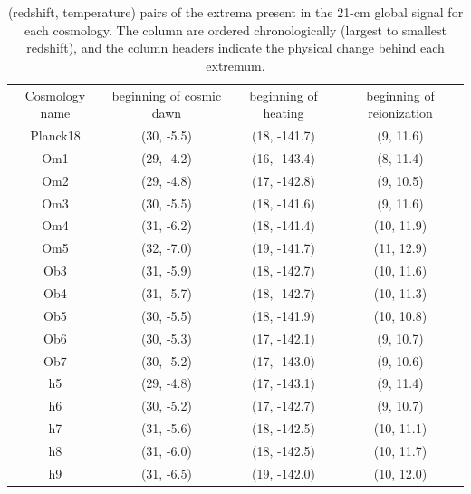 \documentclass[floats,floatfix,showpacs,amssymb,prd,superscriptaddress,nofootinbib]{revtex4-2} %
\begin{document}
\begin{table}[H]
    \centering
    \begin{tabular}{c c c c}
        \hline
        Cosmology name & beginning of cosmic dawn & beginning of heating & beginning of reionization \\ 
        \hhline{= = = =}
        Planck18 & (30, -5.5) & (18, -141.7) & (9, 11.6) \\ \hline
        Om1 & (29, -4.2) & (16, -143.4) & (8, 11.4) \\
        Om2 & (29, -4.8) & (17, -142.8) & (9, 10.5) \\
        Om3 & (30, -5.5) & (18, -141.6) & (9, 11.6) \\
        Om4 & (31, -6.2) & (18, -141.4) & (10, 11.9) \\
        Om5 & (32, -7.0) & (19, -141.7) & (11, 12.9) \\ \hline
        Ob3 & (31, -5.9) & (18, -142.7) & (10, 11.6) \\
        Ob4 & (31, -5.7) & (18, -142.7) & (10, 11.3) \\
        Ob5 & (30, -5.5) & (18, -141.9) & (10, 10.8) \\
        Ob6 & (30, -5.3) & (17, -142.1) & (9, 10.7) \\
        Ob7 & (30, -5.2) & (17, -143.0) & (9, 10.6) \\ \hline
        h5 & (29, -4.8) & (17, -143.1) & (9, 11.4) \\
        h6 & (30, -5.2) & (17, -142.7) & (9, 10.7) \\
        h7 & (31, -5.6) & (18, -142.5) & (10, 11.1) \\
        h8 & (31, -6.0) & (18, -142.5) & (10, 11.7) \\
        h9 & (31, -6.5) & (19, -142.0) & (10, 12.0) \\ \hline
    \end{tabular}
    \caption{(redshift, temperature) pairs of the extrema present in the 21-cm global signal for each cosmology. The column are ordered chronologically (largest to smallest redshift), and the column headers indicate the physical change behind each extremum.}
    \label{tab:global_signal_extrema}
\end{table}
\end{document}
